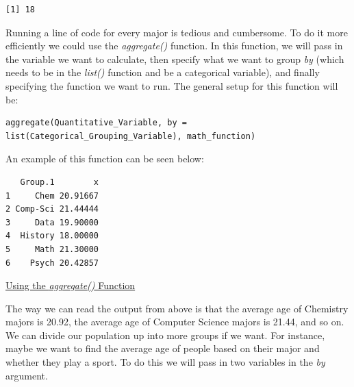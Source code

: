 \documentclass[
  letterpaper,
  DIV=11,
  numbers=noendperiod]{scrreprt}
\newenvironment{Shaded}{\begin{snugshade}}{\end{snugshade}}
\newcommand{\AttributeTok}[1]{\textcolor[rgb]{0.40,0.45,0.13}{#1}}
\newcommand{\FunctionTok}[1]{\textcolor[rgb]{0.28,0.35,0.67}{#1}}
\newcommand{\NormalTok}[1]{\textcolor[rgb]{0.00,0.23,0.31}{#1}}
\newcommand{\SpecialCharTok}[1]{\textcolor[rgb]{0.37,0.37,0.37}{#1}}
\newcommand{\StringTok}[1]{\textcolor[rgb]{0.13,0.47,0.30}{#1}}
\begin{document}
\begin{Shaded}
\end{Shaded}

\begin{verbatim}
[1] 18
\end{verbatim}

Running a line of code for every major is tedious and cumbersome. To do
it more efficiently we could use the \emph{aggregate()} function. In
this function, we will pass in the variable we want to calculate, then
specify what we want to group \emph{by} (which needs to be in the
\emph{list()} function and be a categorical variable), and finally
specifying the function we want to run. The general setup for this
function will be:

\begin{verbatim}
aggregate(Quantitative_Variable, by = list(Categorical_Grouping_Variable), math_function)
\end{verbatim}

An example of this function can be seen below:

\begin{Shaded}
\end{Shaded}

\begin{verbatim}
   Group.1        x
1     Chem 20.91667
2 Comp-Sci 21.44444
3     Data 19.90000
4  History 18.00000
5     Math 21.30000
6    Psych 20.42857
\end{verbatim}

\begin{watch}{}{}
    \href{https://youtu.be/k5Wgr1VVUhw}{Using the \textit{aggregate()} Function}
\end{watch}

The way we can read the output from above is that the average age of
Chemistry majors is 20.92, the average age of Computer Science majors is
21.44, and so on. We can divide our population up into more groups if we
want. For instance, maybe we want to find the average age of people
based on their major and whether they play a sport. To do this we will
pass in two variables in the \emph{by} argument.
\end{document}
